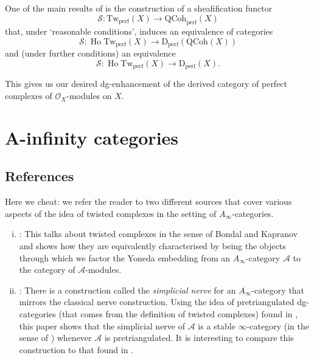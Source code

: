 \documentclass[11pt,notitlepage]{article}
\numberwithin{equation}{subsection}
\begin{document}
                One of the main results of \cite{Wei:2016ip} is the construction of a sheafification functor
                \begin{equation*}
                    \mathcal{S}\colon\mathrm{Tw}_\mathrm{perf}(X)\to\mathrm{QCoh}_\mathrm{perf}(X)
                \end{equation*}
                that, under `reasonable conditions', induces an equivalence of categories
                \begin{equation*}
                    \mathcal{S}\colon\operatorname{Ho}\mathrm{Tw}_\mathrm{perf}(X)\to\mathrm{D}_\mathrm{perf}(\mathrm{QCoh}(X))
                \end{equation*}
                and (under further conditions) an equivalence
                \begin{equation*}
                    \mathcal{S}\colon\operatorname{Ho}\mathrm{Tw}_\mathrm{perf}(X)\to\mathrm{D}_\mathrm{perf}(X).
                \end{equation*}

                This gives us our desired dg-enhancement of the derived category of perfect complexes of $\mathcal{O}_X$-modules on $X$.

        \section{A-infinity categories}

            \subsection{References}

                Here we cheat: we refer the reader to two different sources that cover various aspects of the idea of twisted complexes in the setting of $A_\infty$-categories.
                \begin{enumerate}[(i)]
                    \item \cite{Keller:2001tu}: This talks about twisted complexes in the sense of Bondal and Kapranov and shows how they are equivalently characterised by being the objects through which we factor the Yoneda embedding from an $A_\infty$-category $\mathcal{A}$ to the category of $\mathcal{A}$-modules.
                    \item \cite{Faonte:2015vc}: There is a construction called the \emph{simplicial nerve} for an $A_\infty$-category that mirrors the classical nerve construction.
                        Using the idea of pretriangulated dg-categories (that comes from the definition of twisted complexes) found in \cite{Bondal:1991un}, this paper shows that the simplicial nerve of $\mathcal{A}$ is a stable $\infty$-category (in the sense of \cite{Lurie:2016tv}) whenever $\mathcal{A}$ is pretriangulated.
                        It is interesting to compare this construction to that found in \cite[1.3.1.6]{Lurie:2016tv}.
                \end{enumerate}


    \printbibliography
\end{document}
